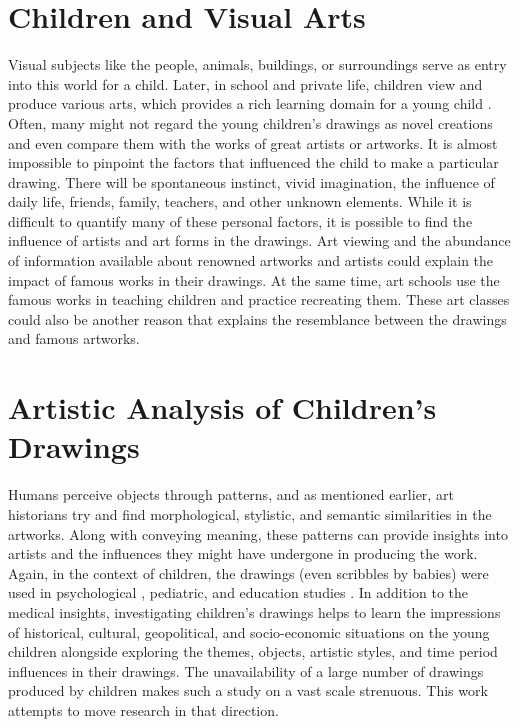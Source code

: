 \section{Children and Visual Arts}

Visual subjects like the people, animals, buildings, or surroundings serve as entry into this world for a child. Later, in school and private life, children view and produce various arts, which provides a rich learning domain for a young child \cite{angela_2008}. Often, many might not regard the young children's drawings as novel creations and even compare them with the works of great artists or artworks. It is almost impossible to pinpoint the factors that influenced the child to make a particular drawing. There will be spontaneous instinct, vivid imagination, the influence of daily life, friends, family, teachers, and other unknown elements. While it is difficult to quantify many of these personal factors, it is possible to find the influence of artists and art forms in the drawings. Art viewing and the abundance of information available about renowned artworks and artists could explain the impact of famous works in their drawings. At the same time, art schools use the famous works in teaching children and practice recreating them. These art classes could also be another reason that explains the resemblance between the drawings and famous artworks.

\section{Artistic Analysis of Children's Drawings}\label{chap:1:sec:children-art-analysis}

Humans perceive objects through patterns, and as mentioned earlier, art historians try and find morphological, stylistic, and semantic similarities in the artworks. Along with conveying meaning, these patterns can provide insights into artists and the influences they might have undergone in producing the work. Again, in the context of children, the drawings (even scribbles by babies) were used in psychological \cite{toku_2001}, pediatric, and education studies \cite{yang2006developmental}. In addition to the medical insights, investigating children's drawings helps to learn the impressions of historical, cultural, geopolitical, and socio-economic situations on the young children alongside exploring the themes, objects, artistic styles, and time period influences in their drawings. The unavailability of a large number of drawings produced by children makes such a study on a vast scale strenuous. This work attempts to move research in that direction.


